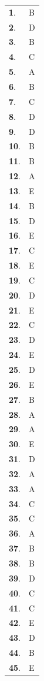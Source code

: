 \documentclass[letterstyle,12pt]{extarticle}
\begin{document}
\begin{supertabular}{ll}
{\bf1}. & B \\ 
{\bf2}. & D \\ 
{\bf3}. & B \\ 
{\bf4}. & C \\ 
{\bf5}. & A \\ 
{\bf6}. & B \\ 
{\bf7}. & C \\ 
{\bf8}. & D \\ 
{\bf9}. & D \\ 
{\bf10}. & B \\ 
{\bf11}. & B \\ 
{\bf12}. & A \\ 
{\bf13}. & E \\ 
{\bf14}. & B \\ 
{\bf15}. & D \\ 
{\bf16}. & E \\ 
{\bf17}. & C \\ 
{\bf18}. & E \\ 
{\bf19}. & C \\ 
{\bf20}. & D \\ 
{\bf21}. & E \\ 
{\bf22}. & C \\ 
{\bf23}. & D \\ 
{\bf24}. & E \\ 
{\bf25}. & D \\ 
{\bf26}. & E \\ 
{\bf27}. & B \\ 
{\bf28}. & A \\ 
{\bf29}. & A \\ 
{\bf30}. & E \\ 
{\bf31}. & D \\ 
{\bf32}. & A \\ 
{\bf33}. & A \\ 
{\bf34}. & C \\ 
{\bf35}. & C \\ 
{\bf36}. & A \\ 
{\bf37}. & B \\ 
{\bf38}. & B \\ 
{\bf39}. & D \\ 
{\bf40}. & C \\ 
{\bf41}. & C \\ 
{\bf42}. & E \\ 
{\bf43}. & D \\ 
{\bf44}. & B \\ 
{\bf45}. & E \\ 

\end{supertabular}
\end{document}
